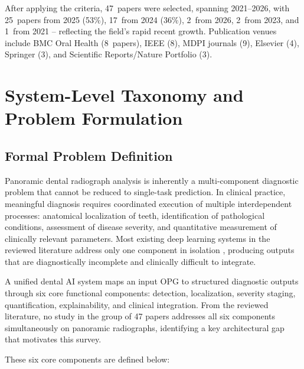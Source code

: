 \documentclass[conference]{IEEEtran}
\begin{document}
After applying the criteria, 47~papers were selected, spanning 2021--2026,
with 25~papers from 2025 (53\%), 17~from 2024 (36\%), 2~from 2026,
2~from 2023, and 1~from 2021 -- reflecting the field's rapid recent
growth. Publication venues include BMC Oral Health (8~papers), IEEE (8),
MDPI journals (9), Elsevier (4), Springer (3), and Scientific
Reports/Nature Portfolio (3).

\section{System-Level Taxonomy and Problem Formulation}
\label{sec:taxonomy}

\subsection{Formal Problem Definition}

Panoramic dental radiograph analysis is inherently a multi-component diagnostic problem that cannot be reduced to single-task prediction. In clinical practice, meaningful diagnosis requires coordinated execution of multiple interdependent processes: anatomical localization of teeth, identification of pathological conditions, assessment of disease severity, and quantitative measurement of clinically relevant parameters. Most existing deep learning systems in the reviewed literature address only one component in isolation
\cite{albano2024artificial,luke2025accuracy,zanini2024systematic},
producing outputs that are diagnostically incomplete and clinically
difficult to integrate.

A unified dental AI system maps an input OPG to structured diagnostic outputs through six core functional components: detection, localization, severity staging, quantification, explainability, and clinical integration. From the reviewed literature, no study in the group of 47 papers addresses all six components simultaneously on panoramic radiographs, identifying a key architectural gap that motivates this survey.

These six core components are defined below:
\end{document}
